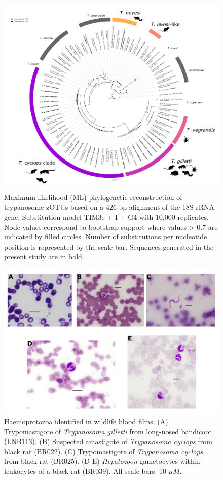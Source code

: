 \documentclass[a4paper, nobind]{templates/ociamthesis}
\begin{document}
\begin{figure}
\includegraphics[width=0.95\linewidth]{figures/ms-figs/Ch4-trypNGStree} \caption[Phylogeny of trypanosomes species from wildlife.]{Maximum likelihood (ML) phylogenetic reconstruction of trypanosome zOTUs based on a 426 bp alignment of the 18S rRNA gene. Substitution model TIM3e + I + G4 with 10,000 replicates. Node values correspond to bootstrap support where values > 0.7 are indicated by filled circles. Number of substitutions per nucleotide position is represented by the scale-bar. Sequences generated in the present study are in bold.}\label{fig:Ch4tryptree}
\end{figure}

\begin{figure}
\includegraphics[width=0.95\linewidth]{figures/ms-figs/Ch4-microscopy-images} \caption[Haemoprotozoans identified in wildlife blood films.]{Haemoprotozoa identified in wildlife blood films. (A) Trypomastigote of \textit{Trypanosoma gilletti} from long-nosed bandicoot (LNB113). (B) Suspected amastigote of \textit{Trypanosoma cyclops} from black rat (BR022). (C) Trypomastigote of \textit{Trypanosoma cyclops} from black rat (BR025). (D-E) \textit{Hepatozoon} gametocytes within leukocytes of a black rat (BR039). All scale-bars: 10 $\mu M$.}\label{fig:microscopy}
\end{figure}
\end{document}
